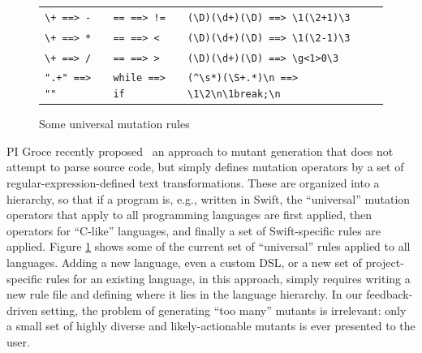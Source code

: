\begin{figure}
\begin{tabularx}{0.75\textwidth}{XXX}
\verb|\+ ==> -| & \verb|== ==> !=| & \verb|(\D)(\d+)(\D) ==> \1(\2+1)\3|\\
\verb|\+ ==> *| & \verb|== ==> <| & \verb|(\D)(\d+)(\D) ==> \1(\2-1)\3|\\
\verb|\+ ==> /| & \verb|== ==> >| & \verb|(\D)(\d+)(\D) ==> \g<1>0\3|\\
\verb|".+" ==> ""| & \verb|while ==> if| & \verb|(^\s*)(\S+.*)\n ==> \1\2\n\1break;\n|\\
\end{tabularx}
\caption{Some universal mutation rules}
\label{fig:rules}
\end{figure}

PI Groce recently proposed~\cite{regexpMut} an approach to mutant generation that does not attempt to parse source code, but simply defines mutation operators by a set of regular-expression-defined text transformations.  These are organized into a hierarchy, so that if a program is, e.g., written in Swift, the ``universal'' mutation operators that apply to all programming languages are first applied, then operators for ``C-like'' languages, and finally a set of Swift-specific rules are applied.  Figure \ref{fig:rules} shows some of the current set of ``universal'' rules applied to all languages.  Adding a new language, even a custom DSL, or a new set of project-specific rules for an existing language, in this approach, simply requires writing a new rule file and defining where it lies in the language hierarchy.  In our feedback-driven setting, the problem of generating ``too many'' mutants is irrelevant: only a small set of highly diverse and likely-actionable mutants is ever presented to the user. %

